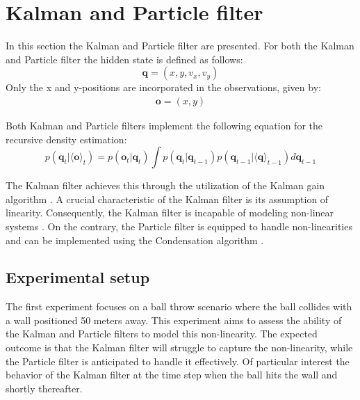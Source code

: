\documentclass[conference]{IEEEtran}
\begin{document}
\section{Kalman and Particle filter}
In this section the Kalman and Particle filter are presented. 
For both the Kalman and Particle filter the hidden state is defined as follows:
\begin{equation*}
\textbf{q} = (x, y, v_x, v_y)   \tag{3}
\end{equation*}
Only the x and y-positions are incorporated in the observations, given by:
\begin{equation*}
    \begin{aligned}
    \textbf{o} = (x, y)
    \end{aligned}
\tag{4}
\end{equation*}

Both Kalman and Particle filters implement the following equation for the recursive density estimation:
\begin{equation*}
    p(\textbf{q}_t | \langle \textbf{o} \rangle _t) =
    p(\textbf{o}_t | \textbf{q}_t) \int p(\textbf{q}_t | \textbf{q}_{t-1}) p(\textbf{q}_{t-1} | \langle \textbf{q} \rangle _{t-1}) d \textbf{q}_{t-1}
\tag{5}
\end{equation*}

The Kalman filter achieves this through the utilization of the Kalman gain algorithm \cite{b2}.
A crucial characteristic of the Kalman filter is its assumption of linearity.
Consequently, the Kalman filter is incapable of modeling non-linear systems \cite{b2}.
On the contrary, the Particle filter is equipped to handle non-linearities and can be implemented using the Condensation algorithm \cite{b3}.


\subsection{Experimental setup}

The first experiment focuses on a ball throw scenario where the ball collides with a wall positioned 50 meters away.
This experiment aims to assess the ability of the Kalman and Particle filters to model this non-linearity.
The expected outcome is that the Kalman filter will struggle to capture the non-linearity, while the Particle filter is anticipated to handle it effectively.
Of particular interest the behavior of the Kalman filter at the time step when the ball hits the wall and shortly thereafter.
\end{document}
